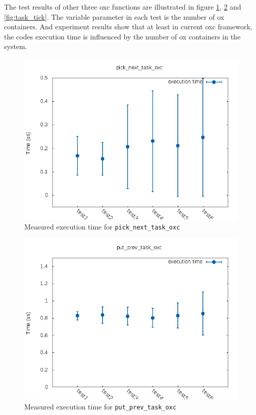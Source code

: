 The test results of other three oxc functions are illustrated in figure 
\ref{fig:pick_next}, \ref{fig:put_prev} and \ref{fig:task_tick}.
The variable parameter in each test is the number of ox containers.
And experiment results show that at least in current oxc framework, the
codes execution time is influenced by the number of ox containers in the
system.

\begin{figure}[H]%
        \centering
        \includegraphics[width=\textwidth, totalheight=0.4\textheight]{images/pick_next_task_oxc}
        \caption{Measured execution time for \texttt{pick\_next\_task\_oxc}}
        \label{fig:pick_next}
\end{figure}
\begin{figure}[H]%
        \centering
        \includegraphics[width=\textwidth, totalheight=0.4\textheight]{images/put_prev_task_oxc}
        \caption{Measured execution time for \texttt{put\_prev\_task\_oxc}}
        \label{fig:put_prev}
\end{figure}
